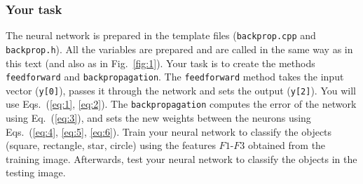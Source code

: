 \documentclass[12pt]{article}
\begin{document}
\subsubsection*{Your task}
The neural network is prepared in the template files (\texttt{backprop.cpp} and \texttt{backprop.h}). All the variables are prepared and are called in the same way as in this text (and also as in Fig.~\ref{fig:1}).
Your task is to create the methods \texttt{feedforward} and \texttt{backpropagation}. 
The \texttt{feedforward} method takes the input vector (\texttt{y[0]}), passes it through the network and sets the output (\texttt{y[2]}).
You will use Eqs.~(\ref{eq:1}, \ref{eq:2}).
The \texttt{backpropagation} computes the error of the network using Eq.~(\ref{eq:3}), and sets the new weights between the neurons using Eqs.~(\ref{eq:4}, \ref{eq:5}, \ref{eq:6}).
Train your neural network to classify the objects (square, rectangle, star, circle) using the features $F1$-$F3$ obtained from the training image.
Afterwards, test your neural network to classify the objects in the testing image.
\end{document}
